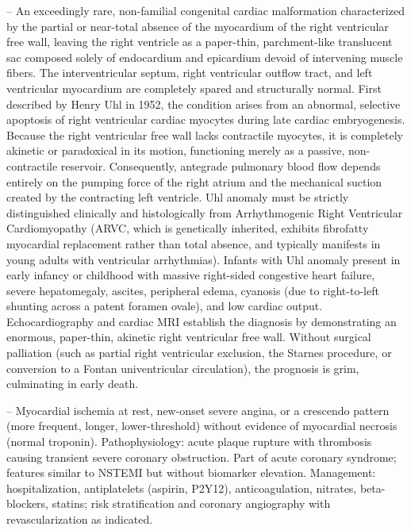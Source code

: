 -- An exceedingly rare, non-familial congenital cardiac malformation characterized by the partial or near-total absence of the myocardium of the right ventricular free wall, leaving the right ventricle as a paper-thin, parchment-like translucent sac composed solely of endocardium and epicardium devoid of intervening muscle fibers. The interventricular septum, right ventricular outflow tract, and left ventricular myocardium are completely spared and structurally normal. First described by Henry Uhl in 1952, the condition arises from an abnormal, selective apoptosis of right ventricular cardiac myocytes during late cardiac embryogenesis. Because the right ventricular free wall lacks contractile myocytes, it is completely akinetic or paradoxical in its motion, functioning merely as a passive, non-contractile reservoir. Consequently, antegrade pulmonary blood flow depends entirely on the pumping force of the right atrium and the mechanical suction created by the contracting left ventricle. Uhl anomaly must be strictly distinguished clinically and histologically from Arrhythmogenic Right Ventricular Cardiomyopathy (ARVC, which is genetically inherited, exhibits fibrofatty myocardial replacement rather than total absence, and typically manifests in young adults with ventricular arrhythmias). Infants with Uhl anomaly present in early infancy or childhood with massive right-sided congestive heart failure, severe hepatomegaly, ascites, peripheral edema, cyanosis (due to right-to-left shunting across a patent foramen ovale), and low cardiac output. Echocardiography and cardiac MRI establish the diagnosis by demonstrating an enormous, paper-thin, akinetic right ventricular free wall. Without surgical palliation (such as partial right ventricular exclusion, the Starnes procedure, or conversion to a Fontan univentricular circulation), the prognosis is grim, culminating in early death.

-- Myocardial ischemia at rest, new-onset severe angina, or a crescendo pattern (more frequent, longer, lower-threshold) without evidence of myocardial necrosis (normal troponin). Pathophysiology: acute plaque rupture with thrombosis causing transient severe coronary obstruction. Part of acute coronary syndrome; features similar to NSTEMI but without biomarker elevation. Management: hospitalization, antiplatelets (aspirin, P2Y12), anticoagulation, nitrates, beta-blockers, statins; risk stratification and coronary angiography with revascularization as indicated.

